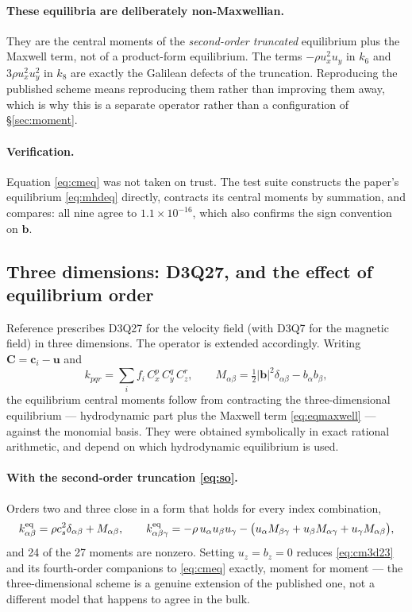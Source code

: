 \documentclass[11pt,a4paper]{article}
\newcommand{\cs}{c_s}
\newcommand{\ci}{\bm{c}_i}
\newcommand{\uu}{\bm{u}}
\newcommand{\bb}{\bm{b}}
\begin{document}
\paragraph{These equilibria are deliberately non-Maxwellian.} They are the central
moments of the \emph{second-order truncated} equilibrium plus the Maxwell term,
not of a product-form equilibrium. The terms $-\rho u_x^2u_y$ in $k_6$ and
$3\rho u_x^2u_y^2$ in $k_8$ are exactly the Galilean defects of the truncation.
Reproducing the published scheme means reproducing them rather than improving
them away, which is why this is a separate operator rather than a configuration
of \S\ref{sec:moment}.

\paragraph{Verification.} Equation \eqref{eq:cmeq} was not taken on trust. The
test suite constructs the paper's equilibrium \eqref{eq:mhdeq} directly,
contracts its central moments by summation, and compares: all nine agree to
$1.1\times10^{-16}$, which also confirms the sign convention on $\bb$.

\subsection{Three dimensions: D3Q27, and the effect of equilibrium order}
\label{sec:mhdcm3d}

Reference \cite{derosis2018} prescribes D3Q27 for the velocity field (with D3Q7
for the magnetic field) in three dimensions. The operator is extended
accordingly. Writing $\bm{C}=\ci-\uu$ and
\begin{equation}
  k_{pqr} = \sum_i f_i\,C_x^p\,C_y^q\,C_z^r,
  \qquad
  M_{\alpha\beta} = \tfrac12|\bb|^2\delta_{\alpha\beta} - b_\alpha b_\beta ,
\end{equation}
the equilibrium central moments follow from contracting the three-dimensional
equilibrium --- hydrodynamic part plus the Maxwell term \eqref{eq:eqmaxwell} ---
against the monomial basis. They were obtained symbolically in exact rational
arithmetic, and depend on which hydrodynamic equilibrium is used.

\paragraph{With the second-order truncation \eqref{eq:so}.} Orders two and three
close in a form that holds for every index combination,
\begin{equation}
  k_{\alpha\beta}^{\rm eq} = \rho\cs^2\delta_{\alpha\beta} + M_{\alpha\beta},
  \qquad
  k_{\alpha\beta\gamma}^{\rm eq} = -\rho\,u_\alpha u_\beta u_\gamma
    - \big(u_\alpha M_{\beta\gamma} + u_\beta M_{\alpha\gamma}
         + u_\gamma M_{\alpha\beta}\big),
  \label{eq:cm3d23}
\end{equation}
and 24 of the 27 moments are nonzero. Setting $u_z=b_z=0$ reduces
\eqref{eq:cm3d23} and its fourth-order companions to \eqref{eq:cmeq} exactly,
moment for moment --- the three-dimensional scheme is a genuine extension of the
published one, not a different model that happens to agree in the bulk.
\end{document}
